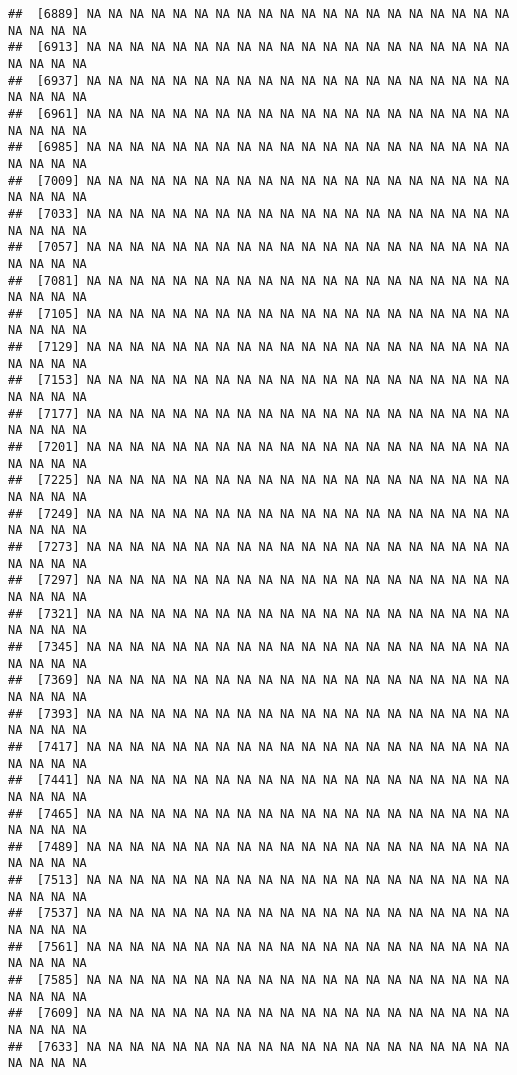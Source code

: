 \documentclass[
]{article}
\begin{document}
\begin{verbatim}
##  [6889] NA NA NA NA NA NA NA NA NA NA NA NA NA NA NA NA NA NA NA NA NA NA NA NA
##  [6913] NA NA NA NA NA NA NA NA NA NA NA NA NA NA NA NA NA NA NA NA NA NA NA NA
##  [6937] NA NA NA NA NA NA NA NA NA NA NA NA NA NA NA NA NA NA NA NA NA NA NA NA
##  [6961] NA NA NA NA NA NA NA NA NA NA NA NA NA NA NA NA NA NA NA NA NA NA NA NA
##  [6985] NA NA NA NA NA NA NA NA NA NA NA NA NA NA NA NA NA NA NA NA NA NA NA NA
##  [7009] NA NA NA NA NA NA NA NA NA NA NA NA NA NA NA NA NA NA NA NA NA NA NA NA
##  [7033] NA NA NA NA NA NA NA NA NA NA NA NA NA NA NA NA NA NA NA NA NA NA NA NA
##  [7057] NA NA NA NA NA NA NA NA NA NA NA NA NA NA NA NA NA NA NA NA NA NA NA NA
##  [7081] NA NA NA NA NA NA NA NA NA NA NA NA NA NA NA NA NA NA NA NA NA NA NA NA
##  [7105] NA NA NA NA NA NA NA NA NA NA NA NA NA NA NA NA NA NA NA NA NA NA NA NA
##  [7129] NA NA NA NA NA NA NA NA NA NA NA NA NA NA NA NA NA NA NA NA NA NA NA NA
##  [7153] NA NA NA NA NA NA NA NA NA NA NA NA NA NA NA NA NA NA NA NA NA NA NA NA
##  [7177] NA NA NA NA NA NA NA NA NA NA NA NA NA NA NA NA NA NA NA NA NA NA NA NA
##  [7201] NA NA NA NA NA NA NA NA NA NA NA NA NA NA NA NA NA NA NA NA NA NA NA NA
##  [7225] NA NA NA NA NA NA NA NA NA NA NA NA NA NA NA NA NA NA NA NA NA NA NA NA
##  [7249] NA NA NA NA NA NA NA NA NA NA NA NA NA NA NA NA NA NA NA NA NA NA NA NA
##  [7273] NA NA NA NA NA NA NA NA NA NA NA NA NA NA NA NA NA NA NA NA NA NA NA NA
##  [7297] NA NA NA NA NA NA NA NA NA NA NA NA NA NA NA NA NA NA NA NA NA NA NA NA
##  [7321] NA NA NA NA NA NA NA NA NA NA NA NA NA NA NA NA NA NA NA NA NA NA NA NA
##  [7345] NA NA NA NA NA NA NA NA NA NA NA NA NA NA NA NA NA NA NA NA NA NA NA NA
##  [7369] NA NA NA NA NA NA NA NA NA NA NA NA NA NA NA NA NA NA NA NA NA NA NA NA
##  [7393] NA NA NA NA NA NA NA NA NA NA NA NA NA NA NA NA NA NA NA NA NA NA NA NA
##  [7417] NA NA NA NA NA NA NA NA NA NA NA NA NA NA NA NA NA NA NA NA NA NA NA NA
##  [7441] NA NA NA NA NA NA NA NA NA NA NA NA NA NA NA NA NA NA NA NA NA NA NA NA
##  [7465] NA NA NA NA NA NA NA NA NA NA NA NA NA NA NA NA NA NA NA NA NA NA NA NA
##  [7489] NA NA NA NA NA NA NA NA NA NA NA NA NA NA NA NA NA NA NA NA NA NA NA NA
##  [7513] NA NA NA NA NA NA NA NA NA NA NA NA NA NA NA NA NA NA NA NA NA NA NA NA
##  [7537] NA NA NA NA NA NA NA NA NA NA NA NA NA NA NA NA NA NA NA NA NA NA NA NA
##  [7561] NA NA NA NA NA NA NA NA NA NA NA NA NA NA NA NA NA NA NA NA NA NA NA NA
##  [7585] NA NA NA NA NA NA NA NA NA NA NA NA NA NA NA NA NA NA NA NA NA NA NA NA
##  [7609] NA NA NA NA NA NA NA NA NA NA NA NA NA NA NA NA NA NA NA NA NA NA NA NA
##  [7633] NA NA NA NA NA NA NA NA NA NA NA NA NA NA NA NA NA NA NA NA NA NA NA NA

\end{verbatim}
\end{document}
